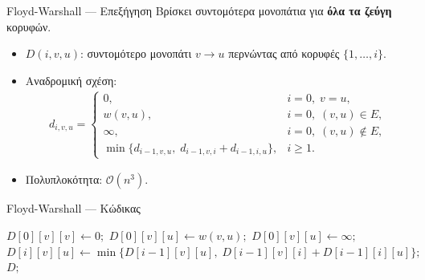 \documentclass{beamer}
\makeatletter
\newenvironment{yellowalgo}{
    \begin{tcolorbox}[colback=myyellow, colframe=myyellow, boxrule=0.5pt]
    \begin{algorithmic}[1]
    \setcounter{ALG@line}{-1}
}{
    \end{algorithmic}
    \end{tcolorbox}
}
\makeatother
\begin{document}
\begin{frame}{Floyd-Warshall --- Επεξήγηση}
Βρίσκει συντομότερα μονοπάτια για \textbf{όλα τα ζεύγη} κορυφών.
\begin{itemize}
    \item $D(i,v,u)$: συντομότερο μονοπάτι $v \to u$ περνώντας από κορυφές $\{1,\dots,i\}$.
    \item Αναδρομική σχέση:
    \begin{align*}
        d_{i,v,u} =
        \begin{cases}
            0, & i=0,\; v=u, \\
            w(v,u), & i=0,\; (v,u)\in E, \\
            \infty, & i=0,\; (v,u)\notin E, \\
            \min\{d_{i-1,v,u},\; d_{i-1,v,i}+d_{i-1,i,u}\}, & i\geq 1.
        \end{cases}
    \end{align*}
    \item Πολυπλοκότητα: $\mathcal{O}(n^3)$.
\end{itemize}
\end{frame}

\begin{frame}{Floyd-Warshall --- Κώδικας}
\begin{yellowalgo}
            \State $D[0][v][v] \gets 0;$
                    \State $D[0][v][u] \gets w(v, u);$
                \Else     
                    \State $D[0][v][u] \gets \infty;$
                \EndIf
            \EndFor
        \EndFor
                    \State $D[i][v][u] \gets \min\{D[i-1][v][u],\; D[i-1][v][i]+D[i-1][i][u]\};$
                \EndFor
            \EndFor
        \EndFor
        \State \Return $D;$
    \EndFunction
\end{yellowalgo}
\end{frame}
\end{document}
